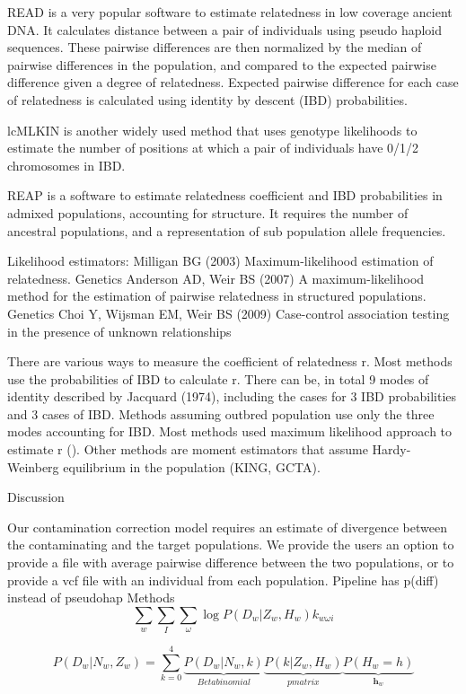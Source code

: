 \documentclass[12pt, letterpaper]{article}
\begin{document}
READ is a very popular software to estimate relatedness in low coverage ancient DNA. It calculates distance between a pair of individuals using pseudo haploid sequences. These pairwise differences are then normalized by the median of pairwise differences in the population, and compared to the expected pairwise difference given a degree of relatedness. Expected pairwise difference for each case of relatedness is calculated using identity by descent (IBD) probabilities. 

lcMLKIN is another widely used method that uses genotype likelihoods to estimate the number of positions at which a pair of individuals have 0/1/2 chromosomes in IBD.  

REAP is a software to estimate relatedness coefficient and IBD probabilities in admixed populations, accounting for structure. It requires the number of ancestral populations, and a representation of sub population allele frequencies. 

Likelihood estimators:
Milligan BG (2003) Maximum-likelihood estimation of relatedness. Genetics
Anderson AD, Weir BS (2007) A maximum-likelihood method for the estimation of pairwise relatedness in structured populations. Genetics
Choi Y, Wijsman EM, Weir BS (2009) Case-control association testing in the presence of unknown relationships

There are various ways to measure the coefficient of relatedness r. Most methods use the probabilities of IBD to calculate r. There can be, in total 9 modes of identity described by Jacquard (1974), including the cases for 3 IBD probabilities and 3 cases of IBD. Methods assuming outbred population use only the three modes accounting for IBD. Most methods used maximum likelihood approach to estimate r (). Other methods are moment estimators that assume Hardy-Weinberg equilibrium in the population (KING, GCTA).

Discussion

Our contamination correction model requires an estimate of divergence between the contaminating and the target populations. We provide the users an option to provide a file with average pairwise difference between the two populations, or to provide a vcf file with an individual from each population. 
Pipeline has p(diff) instead of pseudohap
Methods
$$\sum_{w} \sum_{I}\sum_\omega \log P(D_{w}|Z_w, H_w)k_{w\omega i}$$



$$P(D_w | N_w, Z_w) = \sum_{k=0}^4 
\underbrace{P(D_w | N_w, k)}_{Betabinomial}
\underbrace{P(k | Z_w, H_w)}_{p matrix}
\underbrace{P(H_w =h)}_{\mathbf{h}_w}
$$
\end{document}
